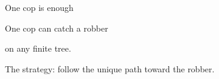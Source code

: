 


\begin{frame}{One cop is enough}
  \begingroup
    \Large
    \begin{theorem}[Trees]\label{thm:tree}
      One cop can catch a robber\par
      on any finite tree.
    \end{theorem}
  \endgroup
  \bigskip
  The strategy: follow the unique path toward the robber.
\end{frame}

